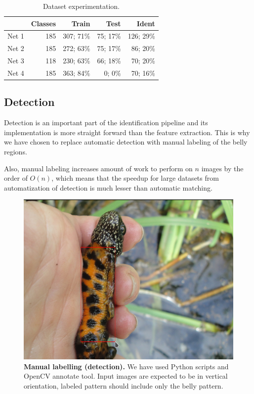 \documentclass[fleqn,moreauthors,10pt]{ds_report}
\begin{document}
\begin{table}[h]
	\caption{Dataset experimentation.}
	\centering
	\begin{tabular}{l r r r r}
		\toprule
		          & Classes & Train       & Test       & Ident      \\
		\midrule
		Net 1     & 185     & 307; 71\%   & 75; 17\%   & 126; 29\% \\
		Net 2     & 185     & 272; 63\%   & 75; 17\%   & 86; 20\% \\
		Net 3     & 118     & 230; 63\%   & 66; 18\%   & 70; 20\% \\
		Net 4     & 185     & 363; 84\%   & 0; 0\%     & 70; 16\% \\
		\bottomrule
	\end{tabular}
	\label{tab:dataset-experimentation}
\end{table}

\subsection*{Detection}

Detection is an important part of the identification pipeline and its implementation is more straight forward than the feature extraction. This is why we have chosen to replace automatic detection with manual labeling of the belly regions.

Also, manual labeling increases amount of work to perform on $n$ images by the order of $O(n)$, which means that the speedup for large datasets from automatization of detection is much lesser than automatic matching. 

\begin{figure}[!h]\centering
	\includegraphics[width=0.8\linewidth]{labelling.png}
	\caption{\textbf{Manual labelling (detection).} We have used Python scripts and OpenCV annotate tool. Input images are expected to be in vertical orientation, labeled pattern should include only the belly pattern. }
	\label{fig:manual-labelling}
\end{figure}
\end{document}
